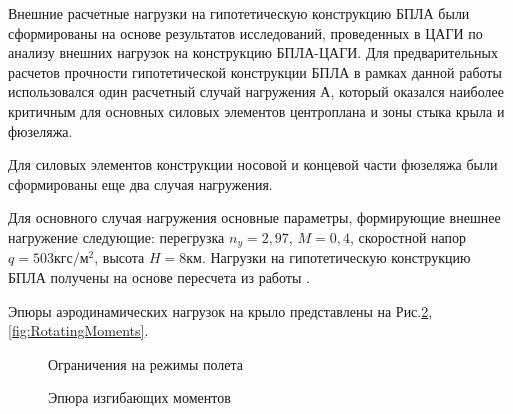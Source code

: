 Внешние расчетные нагрузки на гипотетическую конструкцию БПЛА были сформированы на основе результатов исследований, проведенных в ЦАГИ \cite{BPS_TSAGI} по анализу внешних нагрузок на конструкцию БПЛА-ЦАГИ. Для предварительных расчетов прочности гипотетической конструкции БПЛА в рамках данной работы использовался один расчетный случай нагружения А, который оказался наиболее критичным для основных силовых элементов центроплана и зоны стыка крыла и фюзеляжа. 

Для силовых элементов конструкции носовой и концевой части фюзеляжа были сформированы еще два случая нагружения. 


Для основного случая нагружения основные параметры, формирующие внешнее нагружение следующие: перегрузка $n_y = 2,97$, $M = 0,4$, скоростной напор $q = 503 \text{кгс}/\text{м}^2$, высота $H = 8\text{км}$. Нагрузки на гипотетическую конструкцию БПЛА получены на основе пересчета из работы \cite{BPS}.

Эпюры аэродинамических нагрузок на крыло представлены на Рис.\ref{fig:BendingMoments},\ref{fig:RotatingMoments}.

%

\begin{figure}[H]
\centering
\def\svgwidth{0.9\textwidth}

\caption{Ограничения на режимы полета}
\label{fig:ModeOfFlight}
\end{figure}


\begin{figure}[H]
\centering
\def\svgwidth{0.9\textwidth}

\caption{Эпюра изгибающих моментов}
\label{fig:BendingMoments}
\end{figure}


%

%

